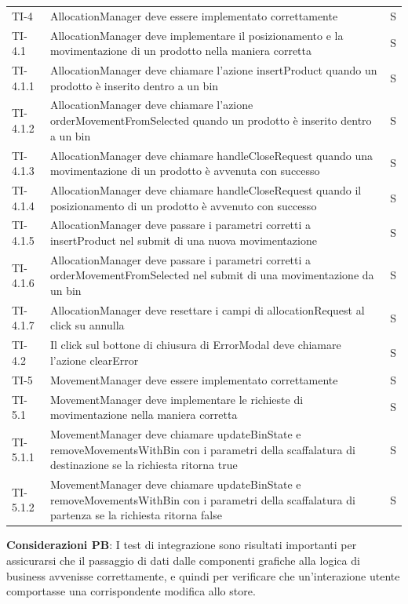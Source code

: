 \begin{xltabular}{0.9\textwidth}{X | p{0.6\textwidth}  | p{0.1\textwidth}}
    TI-4 & AllocationManager deve essere implementato correttamente & S\\
    TI-4.1 & AllocationManager deve implementare il posizionamento e la movimentazione di un prodotto nella maniera corretta & S\\
    TI-4.1.1 & AllocationManager deve chiamare l'azione insertProduct quando un prodotto è inserito dentro a un bin & S\\
    TI-4.1.2 & AllocationManager deve chiamare l'azione orderMovementFromSelected quando un prodotto è inserito dentro a un bin & S\\
    TI-4.1.3 & AllocationManager deve chiamare handleCloseRequest quando una movimentazione di un prodotto è avvenuta con successo  & S\\
    TI-4.1.4 & AllocationManager deve chiamare handleCloseRequest quando il posizionamento di un prodotto è avvenuto con successo & S\\
    TI-4.1.5 & AllocationManager deve passare i parametri corretti a insertProduct nel submit di una nuova movimentazione & S\\
    TI-4.1.6 & AllocationManager deve passare i parametri corretti a orderMovementFromSelected nel submit di una movimentazione da un bin & S\\
    TI-4.1.7 & AllocationManager deve resettare i campi di allocationRequest al click su annulla & S\\
    TI-4.2 & Il click sul bottone di chiusura di ErrorModal deve chiamare l'azione clearError & S\\
    
    TI-5 & MovementManager deve essere implementato correttamente & S\\
    TI-5.1 & MovementManager deve implementare le richieste di movimentazione nella maniera corretta & S\\
    TI-5.1.1 & MovementManager deve chiamare updateBinState e removeMovementsWithBin con i parametri della scaffalatura di destinazione se la richiesta ritorna true & S\\
    TI-5.1.2 & MovementManager deve chiamare updateBinState e removeMovementsWithBin con i parametri della scaffalatura di partenza se la richiesta ritorna false & S\\
\end{xltabular}

\vspace{0.2cm} \noindent\textbf{Considerazioni PB}: I test di integrazione sono risultati importanti per assicurarsi che il passaggio di dati dalle componenti grafiche alla logica di business avvenisse correttamente, e quindi per verificare che un'interazione utente comportasse una corrispondente modifica allo store.

